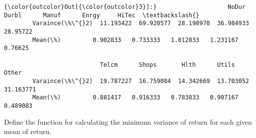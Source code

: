 \documentclass[11pt]{article}
\begin{document}
\begin{Verbatim}[commandchars=\\\{\}]
{\color{outcolor}Out[{\color{outcolor}3}]:}                    NoDur      Durbl      Manuf      Enrgy     HiTec  \textbackslash{}
        Varaince(\%\^{}2)  11.193422  69.920577  28.198970  36.984933  28.95722   
        Mean(\%)         0.902833   0.733333   1.012833   1.231167   0.76625   
        
                           Telcm      Shops       Hlth      Utils      Other  
        Varaince(\%\^{}2)  19.787227  16.759084  14.342669  13.703052  31.163771  
        Mean(\%)         0.881417   0.916333   0.783833   0.907167   0.489083  
\end{Verbatim}
            
    Define the function for calculating the minimum variance of return for
each given mean of return.
\end{document}
